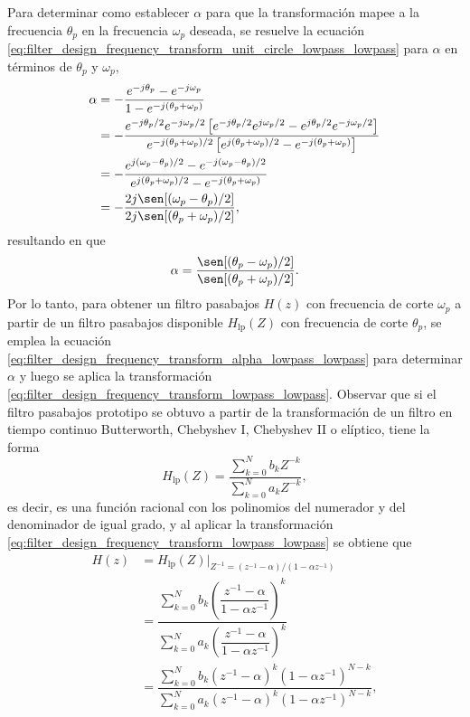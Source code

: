 \documentclass[a4paper]{report}
\begin{document}
Para determinar como establecer \(\alpha\) para que la transformación mapee a la frecuencia \(\theta_p\) en la frecuencia \(\omega_p\) deseada, se resuelve la ecuación \ref{eq:filter_design_frequency_transform_unit_circle_lowpass_lowpass} para \(\alpha\) en términos de \(\theta_p\) y \(\omega_p\), 
\begin{align*}
 \alpha&=-\frac{e^{-j\theta_p}-e^{-j\omega_p}}{1-e^{-j(\theta_p+\omega_p)}}\\
   &=-\frac{e^{-j\theta_p/2}e^{-j\omega_p/2}\left[e^{-j\theta_p/2}e^{j\omega_p/2}-e^{j\theta_p/2}e^{-j\omega_p/2}\right]}{e^{-j(\theta_p+\omega_p)/2}\left[e^{j(\theta_p+\omega_p)/2}-e^{-j(\theta_p+\omega_p)}\right]}\\
   &=-\frac{e^{j(\omega_p-\theta_p)/2}-e^{-j(\omega_p-\theta_p)/2}}{e^{j(\theta_p+\omega_p)/2}-e^{-j(\theta_p+\omega_p)}}\\
   &=-\frac{2j\sen[(\omega_p-\theta_p)/2]}{2j\sen[(\theta_p+\omega_p)/2]},
\end{align*}
resultando en que 
\begin{equation}\label{eq:filter_design_frequency_transform_alpha_lowpass_lowpass}
 \alpha=\frac{\sen[(\theta_p-\omega_p)/2]}{\sen[(\theta_p+\omega_p)/2]}.
\end{equation}
Por lo tanto, para obtener un filtro pasabajos \(H(z)\) con frecuencia de corte \(\omega_p\) a partir de un filtro pasabajos disponible \(H_\textrm{lp}(Z)\) con frecuencia de corte \(\theta_p\), se emplea la ecuación \ref{eq:filter_design_frequency_transform_alpha_lowpass_lowpass} para determinar \(\alpha\) y luego se aplica la transformación \ref{eq:filter_design_frequency_transform_lowpass_lowpass}. Observar que si el filtro pasabajos prototipo se obtuvo a partir de la transformación de un filtro en tiempo continuo Butterworth, Chebyshev I, Chebyshev II o elíptico, tiene la forma  
\[
 H_\textrm{lp}(Z)=\dfrac{\displaystyle\sum_{k=0}^Nb_kZ^{-k}}{\displaystyle\sum_{k=0}^Na_kZ^{-k}},
\]
es decir, es una función racional con los polinomios del numerador y del denominador de igual grado, y al aplicar la transformación \ref{eq:filter_design_frequency_transform_lowpass_lowpass} se obtiene que 
\begin{align*}
 H(z)&=H_\textrm{lp}(Z)\Big|_{Z^{-1}=(z^{-1}-\alpha)/(1-\alpha z^{-1})}\\
  &=\dfrac{\displaystyle\sum_{k=0}^Nb_k\left(\dfrac{z^{-1}-\alpha}{1-\alpha z^{-1}}\right)^k}{\displaystyle\sum_{k=0}^Na_k\left(\dfrac{z^{-1}-\alpha}{1-\alpha z^{-1}}\right)^k}\\
  &=\dfrac{\displaystyle\sum_{k=0}^Nb_k(z^{-1}-\alpha)^k(1-\alpha z^{-1})^{N-k}}{\displaystyle\sum_{k=0}^Na_k(z^{-1}-\alpha)^k(1-\alpha z^{-1})^{N-k}},
\end{align*}
\end{document}
